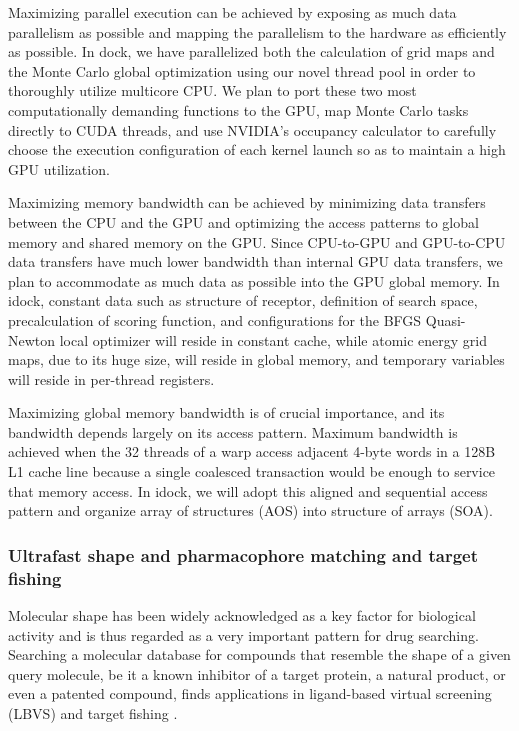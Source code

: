 \documentclass[a4paper,12pt]{article}
\begin{document}
Maximizing parallel execution can be achieved by exposing as much data parallelism as possible and mapping the parallelism to the hardware as efficiently as possible. In dock, we have parallelized both the calculation of grid maps and the Monte Carlo global optimization using our novel thread pool in order to thoroughly utilize multicore CPU. We plan to port these two most computationally demanding functions to the GPU, map Monte Carlo tasks directly to CUDA threads, and use NVIDIA's occupancy calculator to carefully choose the execution configuration of each kernel launch so as to maintain a high GPU utilization.

Maximizing memory bandwidth can be achieved by minimizing data transfers between the CPU and the GPU and optimizing the access patterns to global memory and shared memory on the GPU. Since CPU-to-GPU and GPU-to-CPU data transfers have much lower bandwidth than internal GPU data transfers, we plan to accommodate as much data as possible into the GPU global memory. In idock, constant data such as structure of receptor, definition of search space, precalculation of scoring function, and configurations for the BFGS Quasi-Newton local optimizer will reside in constant cache, while atomic energy grid maps, due to its huge size, will reside in global memory, and temporary variables will reside in per-thread registers.

Maximizing global memory bandwidth is of crucial importance, and its bandwidth depends largely on its access pattern. Maximum bandwidth is achieved when the 32 threads of a warp access adjacent 4-byte words in a 128B L1 cache line because a single coalesced transaction would be enough to service that memory access. In idock, we will adopt this aligned and sequential access pattern and organize array of structures (AOS) into structure of arrays (SOA).

\subsubsection*{Ultrafast shape and pharmacophore matching and target fishing}

Molecular shape has been widely acknowledged as a key factor for biological activity and is thus regarded as a very important pattern for drug searching. Searching a molecular database for compounds that resemble the shape of a given query molecule, be it a known inhibitor of a target protein, a natural product, or even a patented compound, finds applications in ligand-based virtual screening (LBVS) \citep{1332,1380,1281,1504,1502,1615} and target fishing \citep{1528,1407,1408,1402}.
\end{document}
